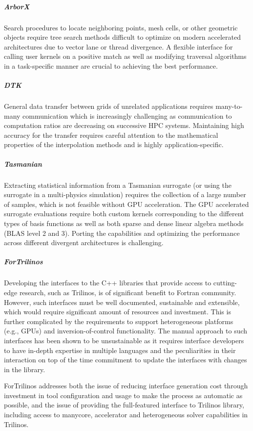 \subparagraph{ArborX} Search procedures to locate neighboring points, mesh cells, or
other geometric objects require tree search methods difficult to optimize on
modern accelerated architectures due to vector lane or thread divergence. A
flexible interface for calling user kernels on a positive match as well as
modifying traversal algorithms in a task-specific manner are crucial to
achieving the best performance.

\subparagraph{DTK} General data transfer between grids of unrelated applications
requires many-to-many communication which is increasingly challenging as
communication to computation ratios are decreasing on successive HPC systems.
Maintaining high accuracy for the transfer requires careful attention to the
mathematical properties of the interpolation methods and is highly
application-specific.

\subparagraph{Tasmanian} Extracting statistical information from a Tasmanian surrogate
(or using the surrogate in a multi-physics simulation) requires the collection
of a large number of samples, which is not feasible without GPU acceleration.
The GPU accelerated surrogate evaluations require both custom kernels
corresponding to the different types of basis functions as well as both
sparse and dense linear algebra methods (BLAS level 2 and 3).
Porting the capabilities and optimizing the performance across different
divergent architectures is challenging.

\subparagraph{ForTrilinos}
Developing the interfaces to the C++ libraries that provide access to
cutting-edge research, such as Trilinos,  is of significant benefit to Fortran
community. However, such interfaces must be well documented, sustainable and
extensible, which would require significant amount of resources and investment.
This is further complicated by the requirements to support heterogeneous
platforms (e.g., GPUs) and inversion-of-control functionality. The manual
approach to such interfaces has been shown to be unsustainable as it requires
interface developers to have in-depth expertise in  multiple languages and the
peculiarities in their interaction on top of the time commitment to update the
interfaces with changes in the library.

ForTrilinos addresses both the issue of reducing interface generation cost
through investment in tool configuration and usage to make the process as
automatic as possible, and the issue of providing the full-featured interface to
Trilinos library, including access to manycore, accelerator and heterogeneous
solver capabilities in Trilinos.


